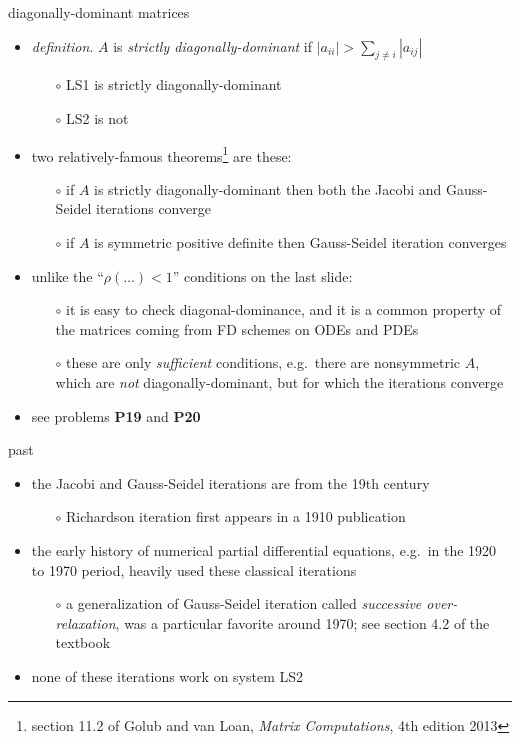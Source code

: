 \documentclass[10pt,hyperref]{beamer}
\begin{document}
\begin{frame}{diagonally-dominant matrices}

\begin{itemize}
\item \emph{definition}.  $A$ is \emph{strictly diagonally-dominant} if $|a_{ii}| > \sum_{j\ne i} |a_{ij}|$
  \begin{itemize}
  \item[$\circ$] LS1 is strictly diagonally-dominant
  \item[$\circ$] LS2 is not
  \end{itemize}

\item two relatively-famous theorems\footnote{section 11.2 of Golub and van Loan, \emph{Matrix Computations}, 4th edition 2013} are these:
  \begin{itemize}
  \item[$\circ$] if $A$ is strictly diagonally-dominant then both the Jacobi and Gauss-Seidel iterations converge 
  \item[$\circ$] if $A$ is symmetric positive definite then Gauss-Seidel iteration converges
  \end{itemize}
\item unlike the ``$\rho(\dots) < 1$'' conditions on the last slide:
  \begin{itemize}
  \item[$\circ$] it is easy to check diagonal-dominance, and it is a common property of the matrices coming from FD schemes on ODEs and PDEs
  \item[$\circ$] these are only \emph{sufficient} conditions, e.g.~there are nonsymmetric $A$, which are \emph{not} diagonally-dominant, but for which the iterations converge
  \end{itemize}

\medskip
\item see problems \textbf{P19} and \textbf{P20}
\end{itemize}
\end{frame}


\begin{frame}{past}

\begin{itemize}
\item the Jacobi and Gauss-Seidel iterations are from the 19th century
  \begin{itemize}
  \item[$\circ$] Richardson iteration first appears in a 1910 publication
  \end{itemize}
\item the early history of numerical partial differential equations, e.g.~in the 1920 to 1970 period, heavily used these classical iterations
  \begin{itemize}
  \item[$\circ$] a generalization of Gauss-Seidel iteration called \emph{successive over-relaxation}, was a particular favorite around 1970;  see section 4.2 of the textbook
  \end{itemize}
\item none of these iterations work on system LS2
\end{itemize}
\end{frame}
\end{document}
